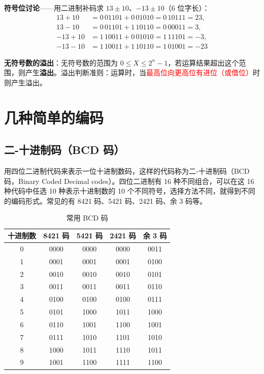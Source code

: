 \textbf{符号位讨论}——用二进制补码求 $13\pm10$、$-13\pm10$（6 位字长）：
\begin{equation}
	\begin{aligned}
		13+10 &= 0\,01101+0\,01010=0\,10111=23,\\
		13-10 &= 0\,01101+1\,10110=0\,00011=3,\\
		-13+10 &= 1\,10011+0\,01010=1\,11101=-3,\\
		-13-10 &= 1\,10011+1\,10110=1\,01001=-23
	\end{aligned}
	\label{eq:补码:符号位讨论例}
\end{equation}

\textbf{无符号数的溢出}：无符号数的范围为 $0\le X\le 2^{n}-1$，若运算结果超出这个范围，则产生\textbf{溢出}。溢出判断准则：运算时，当\textcolor{red}{最高位向更高位有进位（或借位）}时则产生溢出。

\section{几种简单的编码}
\label{sec:几种简单的编码}

\subsection{二-十进制码（BCD 码）}
\label{sec:BCD码}

\begin{definition}
	\label{def:BCD码}
	用四位二进制代码来表示一位十进制数码，这样的代码称为二-十进制码（BCD 码，Binary Coded Decimal codes）。四位二进制有 16 种不同组合，可以在这 16 种代码中任选 10 种表示十进制数的 10 个不同符号，选择方法不同，就得到不同的编码形式。常见的有 8421 码、5421 码、2421 码、余 3 码等。
\end{definition}

\begin{table}[H]
\centering
\caption{常用 BCD 码}
\label{tab:编码:常用BCD码}
\begin{tabular}{ccccc}
	\toprule
	十进制数 & 8421 码 & 5421 码 & 2421 码 & 余 3 码 \\
	\midrule
	0 & 0000 & 0000 & 0000 & 0011 \\
	1 & 0001 & 0001 & 0001 & 0100 \\
	2 & 0010 & 0010 & 0010 & 0101 \\
	3 & 0011 & 0011 & 0011 & 0110 \\
	4 & 0100 & 0100 & 0100 & 0111 \\
	5 & 0101 & 1000 & 1011 & 1000 \\
	6 & 0110 & 1001 & 1100 & 1001 \\
	7 & 0111 & 1010 & 1101 & 1010 \\
	8 & 1000 & 1011 & 1110 & 1011 \\
	9 & 1001 & 1100 & 1111 & 1100 \\
	\bottomrule
\end{tabular}
\end{table}

